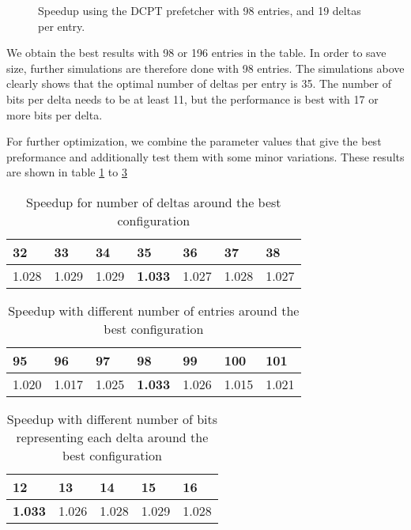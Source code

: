 \begin{figure}[h]
    \begin{centering}
        
        \caption{Speedup using the DCPT prefetcher with 98 entries, and 19 deltas per entry.}
        \label{figure:dcpt-delta-bits}
    \end{centering}
\end{figure}

We obtain the best results with 98 or 196 entries in the table. In order to save size, further simulations are therefore done with 98 entries. The simulations above clearly shows that the optimal number of deltas per entry is 35. The number of bits per delta needs to be at least 11, but the performance is best with 17 or more bits per delta. 

For further optimization, we combine the parameter values that give the best preformance and additionally test them with some minor variations. These results are shown in table \ref{tab:numdelta} to \ref{tab:deltabits}


\begin{table}[h]
\centering
\label{tab:numdelta}
\begin{tabular}{|l|l|l|l|l|l|l|}
\hline
32    & 33    & 34    & \textbf{35}    & 36    & 37    & 38    \\ \hline
1.028 & 1.029 & 1.029 & \textbf{1.033} & 1.027 & 1.028 & 1.027 \\ \hline
\end{tabular}
\smallskip
\caption{Speedup for number of deltas around the best configuration}
\end{table}


\begin{table}[h]
\centering
\label{tab:tablesize}
\begin{tabular}{|l|l|l|l|l|l|l|}
\hline
95    & 96    & 97    & \textbf{98}    & 99    & 100   & 101   \\ \hline
1.020 & 1.017 & 1.025 & \textbf{1.033} & 1.026 & 1.015 & 1.021 \\ \hline
\end{tabular}
\smallskip
\caption{Speedup with different number of entries around the best configuration}
\end{table}


\begin{table}[h]
\centering
\label{tab:deltabits}
\begin{tabular}{|l|l|l|l|l|}
\hline
\textbf{12}    & 13    & 14    & 15    & 16    \\ \hline
\textbf{1.033} & 1.026 & 1.028 & 1.029 & 1.028 \\ \hline
\end{tabular}
\smallskip
\caption{Speedup with different number of bits representing each delta around the best configuration}
\end{table}

